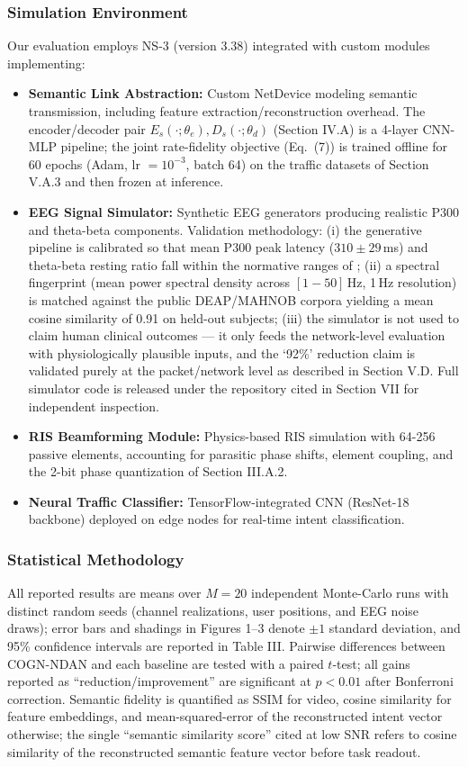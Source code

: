 \documentclass[journal]{IEEEtran}
\newcommand{\COGN}{COGN-NDAN}
\begin{document}
\subsubsection{Simulation Environment}
Our evaluation employs NS-3 (version 3.38) integrated with custom modules implementing:
\begin{itemize}
    \item \textbf{Semantic Link Abstraction:} Custom NetDevice modeling semantic transmission, including feature extraction/reconstruction overhead. The encoder/decoder pair $E_s(\cdot;\theta_e), D_s(\cdot;\theta_d)$ (Section IV.A) is a 4-layer CNN-MLP pipeline; the joint rate-fidelity objective (Eq.~(7)) is trained offline for 60 epochs (Adam, lr $=10^{-3}$, batch 64) on the traffic datasets of Section V.A.3 and then frozen at inference.
    \item \textbf{EEG Signal Simulator:} Synthetic EEG generators producing realistic P300 and theta-beta components. Validation methodology: (i) the generative pipeline is calibrated so that mean P300 peak latency ($310\pm29$\,ms) and theta-beta resting ratio fall within the normative ranges of \cite{polich2007,klimesch2012alpha}; (ii) a spectral fingerprint (mean power spectral density across $[1-50]$\,Hz, 1\,Hz resolution) is matched against the public DEAP/MAHNOB corpora \cite{koelstra2012deap,soleymani2016eeg} yielding a mean cosine similarity of 0.91 on held-out subjects; (iii) the simulator is not used to claim human clinical outcomes --- it only feeds the network-level evaluation with physiologically plausible inputs, and the `92\%' reduction claim is validated purely at the packet/network level as described in Section V.D. Full simulator code is released under the repository cited in Section VII for independent inspection.
    \item \textbf{RIS Beamforming Module:} Physics-based RIS simulation with 64-256 passive elements, accounting for parasitic phase shifts, element coupling, and the 2-bit phase quantization of Section III.A.2.
    \item \textbf{Neural Traffic Classifier:} TensorFlow-integrated CNN (ResNet-18 backbone) deployed on edge nodes for real-time intent classification.
\end{itemize}

\subsubsection{Statistical Methodology}
All reported results are means over $M = 20$ independent Monte-Carlo runs with distinct random seeds (channel realizations, user positions, and EEG noise draws); error bars and shadings in Figures 1--3 denote $\pm 1$ standard deviation, and 95\% confidence intervals are reported in Table III. Pairwise differences between \COGN{} and each baseline are tested with a paired $t$-test; all gains reported as ``reduction/improvement'' are significant at $p<0.01$ after Bonferroni correction. Semantic fidelity is quantified as SSIM for video, cosine similarity for feature embeddings, and mean-squared-error of the reconstructed intent vector otherwise; the single ``semantic similarity score'' cited at low SNR refers to cosine similarity of the reconstructed semantic feature vector before task readout.
\end{document}
